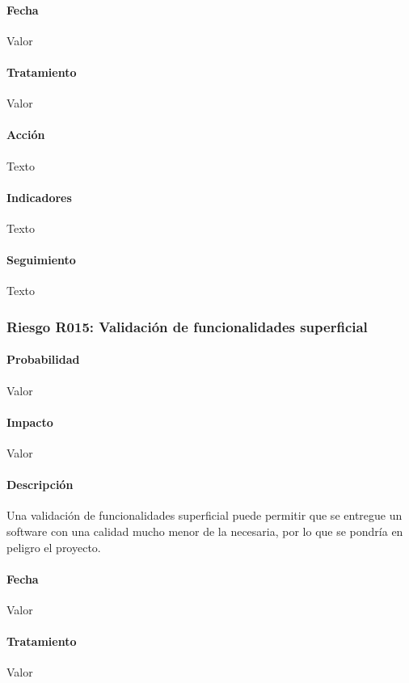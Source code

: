 \documentclass[10pt,a4paper]{article}
\begin{document}
				\paragraph{Fecha} Valor %
				\paragraph{Tratamiento} Valor %
				\paragraph{Acción} Texto %
				\paragraph{Indicadores} Texto %
				\paragraph{Seguimiento}	Texto %
				\subsubsection{Riesgo R015: Validación de funcionalidades superficial}
				\paragraph{Probabilidad} Valor
				\paragraph{Impacto}	Valor
				\paragraph{Descripción} Una validación de funcionalidades superficial puede permitir que se entregue un software con una calidad mucho menor de la necesaria, por lo que se pondría en peligro el proyecto. 
				\paragraph{Fecha} Valor %
				\paragraph{Tratamiento} Valor %
\end{document}
